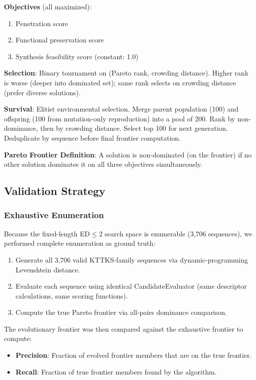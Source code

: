 \documentclass[11pt,a4paper]{article}
\begin{document}
\textbf{Objectives} (all maximized):
\begin{enumerate}
  \item Penetration score
  \item Functional preservation score
  \item Synthesis feasibility score (constant: 1.0)
\end{enumerate}

\textbf{Selection}: Binary tournament on (Pareto rank, crowding distance). Higher rank is worse (deeper into dominated set); same rank selects on crowding distance (prefer diverse solutions).

\textbf{Survival}: Elitist environmental selection. Merge parent population (100) and offspring (100 from mutation-only reproduction) into a pool of 200. Rank by non-dominance, then by crowding distance. Select top 100 for next generation. Deduplicate by sequence before final frontier computation.

\textbf{Pareto Frontier Definition}: A solution is non-dominated (on the frontier) if no other solution dominates it on all three objectives simultaneously.

\subsection{Validation Strategy}

\subsubsection{Exhaustive Enumeration}

Because the fixed-length ED$\leq 2$ search space is enumerable (3,706 sequences), we performed complete enumeration as ground truth:
\begin{enumerate}
  \item Generate all 3,706 valid KTTKS-family sequences via dynamic-programming Levenshtein distance.
  \item Evaluate each sequence using identical CandidateEvaluator (same descriptor calculations, same scoring functions).
  \item Compute the true Pareto frontier via all-pairs dominance comparison.
\end{enumerate}

The evolutionary frontier was then compared against the exhaustive frontier to compute:
\begin{itemize}
  \item \textbf{Precision}: Fraction of evolved frontier members that are on the true frontier.
  \item \textbf{Recall}: Fraction of true frontier members found by the algorithm.
\end{itemize}
\end{document}
